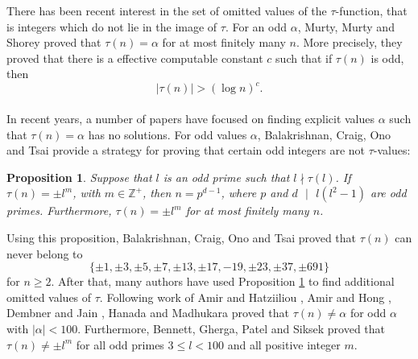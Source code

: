 \documentclass[12pt]{amsart}
\newtheorem{prop}[thm]{Proposition}
\newcommand{\Z}{\mathbb{Z}}
\numberwithin{equation}{section}
\begin{document}
There has been recent interest in the set of omitted values of the $\tau$-function, that is integers which do not lie in the image of $\tau$.  For an odd $\alpha$, Murty, Murty and Shorey \cite{MMS} proved that $\tau(n) = \alpha$ for at most finitely many $n$. More precisely, they proved that there is a effective computable constant $c$ such that if $\tau(n)$ is odd, then $$|\tau(n)| > (\log n)^c.$$\\
In recent years, a number of papers have focused on finding explicit values $\alpha$ such that $\tau(n)=\alpha$ has no solutions. For odd values $\alpha$, Balakrishnan, Craig, Ono and Tsai \cite{BCOT}  provide a strategy for proving that certain odd integers are not $\tau$-values: \\
\begin{prop}\label{1.1}
    Suppose that $l$ is an odd prime such that $l \nmid \tau(l)$. If $\tau(n) = \pm l^m$, with $m \in \Z^+$, then $n = p^{d-1}$, where $p$ and $d \text{ }|\text{ } l(l^2-1)$ are odd primes. Furthermore, $\tau(n) = \pm l^m$ for at most finitely many $n$.
\end{prop}


Using this proposition, Balakrishnan, Craig, Ono and Tsai \cite{BCOT} proved that $\tau(n)$ can never belong to $$\{\pm1,\pm3,\pm5,\pm7,\pm13,\pm17,-19,\pm23,\pm37,\pm691\}$$
for $n\geq2$. After that, many authors have used Proposition \ref{1.1} to find additional omitted values of $\tau$. Following work of Amir and Hatziiliou \cite{AH1}, Amir and Hong \cite{AH2}, Dembner and Jain \cite{DJ}, Hanada and Madhukara \cite{HM} proved that $\tau(n) \neq \alpha$ for odd $\alpha$ with $|\alpha| < 100$. Furthermore, Bennett, Gherga, Patel and Siksek \cite{BGPS} proved that $\tau(n) \neq \pm l^m$ for all odd primes $3 \leq l < 100$ and all positive integer $m$.\\
\end{document}
